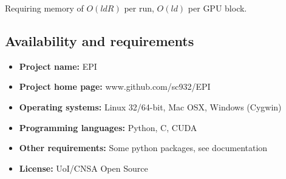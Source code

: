 Requiring memory of $O(ldR)$ per run, $O(ld)$ per GPU block.




\subsection{Availability and requirements}
 \begin{itemize}
  \item \textbf{Project name:} EPI
  \item \textbf{Project home page:} www.github.com/sc932/EPI
  \item \textbf{Operating systems:} Linux 32/64-bit, Mac OSX, Windows (Cygwin)
  \item \textbf{Programming languages:} Python, C, CUDA
  \item \textbf{Other requirements:} Some python packages, see documentation
  \item \textbf{License:} UoI/CNSA Open Source
 \end{itemize}




